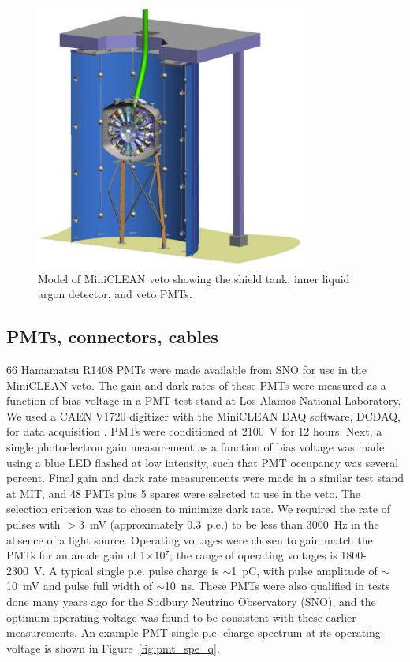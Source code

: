 \documentclass[pdftex]{JINST}
\begin{document}
\begin{figure}[ht]
\begin{center}
\includegraphics[width=3.5in]{graphics/miniclean_overview_drawing.pdf}
\caption{Model of MiniCLEAN veto showing the shield tank, inner liquid argon detector, and veto PMTs.
\label{fig:veto_geom}}
\end{center}
\end{figure}

\subsection{PMTs, connectors, cables}
\label{sec:pmts}
%
66 Hamamatsu R1408 PMTs were made available from SNO for use in the MiniCLEAN
veto. The gain and dark rates of these PMTs were measured as a
function of bias voltage in a PMT test stand at Los Alamos National
Laboratory. We used a CAEN V1720 digitizer with the MiniCLEAN DAQ
software, DCDAQ, for data acquisition \cite{ref:gastler_thesis}. PMTs were conditioned at 2100~V
for 12 hours. Next, a single photoelectron gain measurement as a
function of bias voltage was made using a blue LED flashed at low
intensity, such that PMT occupancy was several percent. Final gain and
dark rate measurements were made in a similar test stand at MIT, and
48 PMTs plus 5 spares were selected to use in the veto. The selection
criterion was to chosen to minimize dark rate. We required the rate of pulses with
$>$3~mV (approximately 0.3~p.e.) to be less than 3000~Hz in the
absence of a light source. Operating voltages were chosen to gain
match the PMTs for an anode gain of 1$\times$10$^7$; the range of
operating voltages is 1800-2300~V. A typical single p.e. pulse charge
is $\sim$1~pC, with pulse amplitude of $\sim$10~mV and pulse full width of
$\sim$10~ns. These PMTs were also qualified in tests done many years ago for
the Sudbury Neutrino Observatory (SNO), and the optimum operating voltage was
found to be consistent with these earlier measurements.
An example PMT single p.e. charge spectrum at its operating voltage is
shown in Figure~\ref{fig:pmt_spe_q}.
\end{document}
